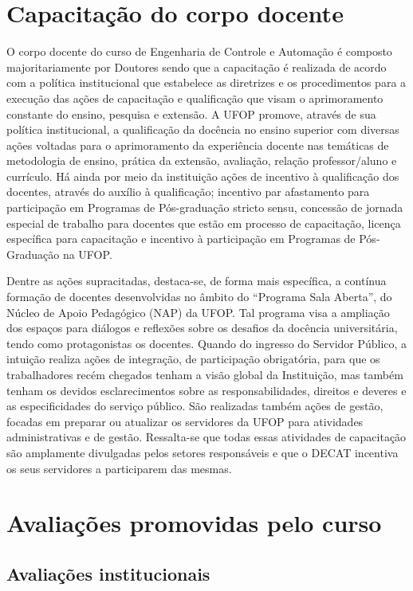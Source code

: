 \documentclass[
	12pt,				%
	openright,			%
	oneside,			%
	a4paper,			%
	english,			%
	brazil				%
	]{abntex2}
\begin{document}
\chapter{Capacitação do corpo docente}

O corpo docente do curso de Engenharia de Controle e Automação é composto majoritariamente por Doutores sendo que a capacitação é realizada de acordo com a política institucional que estabelece as diretrizes e os procedimentos para a execução das ações de capacitação e qualificação que visam o aprimoramento constante do ensino, pesquisa e extensão. A UFOP promove, através de sua política institucional, a qualificação da docência no ensino superior com diversas ações voltadas para o aprimoramento da experiência docente nas temáticas de metodologia de ensino, prática da extensão, avaliação, relação professor/aluno e currículo. Há ainda por meio da instituição ações de incentivo à qualificação dos docentes, através do auxílio à qualificação; incentivo par afastamento para participação em Programas de Pós-graduação stricto sensu, concessão de jornada especial de trabalho para docentes que estão em processo de capacitação, licença específica para capacitação e incentivo à participação em Programas de
Pós-Graduação na UFOP.

Dentre as ações supracitadas, destaca-se, de forma mais específica, a contínua formação de docentes desenvolvidas no âmbito do ``Programa Sala Aberta'', do Núcleo de Apoio Pedagógico (NAP) da UFOP. Tal programa visa a ampliação dos espaços para diálogos e reflexões sobre os desafios da docência universitária, tendo como protagonistas os docentes. Quando do ingresso do Servidor Público, a intuição realiza ações de integração, de participação obrigatória, para que os trabalhadores recém chegados tenham a visão global da Instituição, mas também tenham os devidos esclarecimentos sobre as responsabilidades, direitos e deveres e as especificidades do serviço público. São realizadas também ações de gestão, focadas em preparar ou atualizar os servidores da UFOP para atividades administrativas e de gestão. Ressalta-se que todas essas atividades de capacitação são amplamente divulgadas pelos setores responsáveis e que o DECAT incentiva os seus servidores a participarem das mesmas.


\chapter{Avaliações promovidas pelo curso}

\section{Avaliações institucionais}
\end{document}
